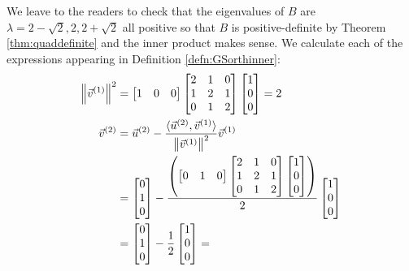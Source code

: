 \begin{solution}
We leave to the readers to check that the eigenvalues of $B$ are $\lambda = 2-\sqrt{2},2,2+\sqrt{2}$ all positive so that $B$ is positive-definite by Theorem \ref{thm:quaddefinite} and the inner product makes sense. We calculate each of the expressions appearing in Definition \ref{defn:GSorthinner}:
\begin{align*}
\norm{\vec{v}^{(1)}}^2 &= 
\begin{bmatrix}
1 & 0 & 0
\end{bmatrix}
\begin{bmatrix}
2&1&0\\ 
1&2&1\\
0&1&2
\end{bmatrix}
\begin{bmatrix}
1 \\
0 \\
0
\end{bmatrix} = 2 \\
\vec{v}^{(2)} &= \vec{u}^{(2)} - \frac{\langle \vec{u}^{(2)}, \vec{v}^{(1)}\rangle}{\norm{\vec{v}^{(1)}}^2} \vec{v}^{(1)} \\
&= \begin{bmatrix}
0 \\
1 \\
0
\end{bmatrix}
-
\frac{\left(\begin{bmatrix}
0 & 1 & 0
\end{bmatrix}
\begin{bmatrix}
2&1&0\\ 
1&2&1\\
0&1&2
\end{bmatrix}
\begin{bmatrix}
1 \\
0 \\
0
\end{bmatrix}\right)}{2}
\begin{bmatrix}
1 \\
0 \\
0
\end{bmatrix} \\
&= \begin{bmatrix}
0 \\
1 \\
0
\end{bmatrix}
-\frac{1}{2}
\begin{bmatrix}
1 \\
0 \\
0
\end{bmatrix} =

\end{align*}
\end{solution}
